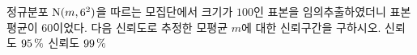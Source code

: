 정규분포 $\mathrm{N}(m{,}\mkern3mu\mathopen{}6^2)$을 따르는 모집단에서 크기가 $100$인 표본을 임의추출하였더니 표본평균이 $60$이었다. 다음 신뢰도로 추정한 모평균 $m$에 대한 신뢰구간을 구하시오. 
 신뢰도 $95\mkern3mu \%$
 신뢰도 $99\mkern3mu \%$
